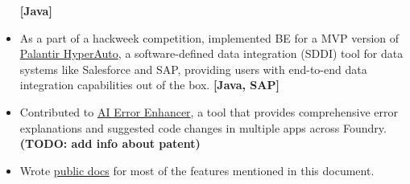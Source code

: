 \begin{itemize}
{    }
    \textbf{[Java]}
    \item {
        As a part of a hackweek competition, implemented BE for a MVP version of
        \href{https://www.palantir.com/docs/foundry/hyperauto/overview/}{Palantir HyperAuto},
        a software-defined data integration (SDDI) tool for data systems like Salesforce and SAP,
        providing users with end-to-end data integration capabilities out of the box.
    }
    \textbf{[Java, SAP]}
    \item {
        Contributed to
        \href{https://www.palantir.com/docs/foundry/code-repositories/aip-features/#ai-error-enhancer}{AI Error Enhancer},
        a tool that provides comprehensive error explanations and suggested code changes in multiple apps across Foundry.
    }
    \textbf{(TODO: add info about patent)}
    \item {
        Wrote
        \href{https://www.palantir.com/docs/foundry/}{public docs}
        for most of the features mentioned in this document.
    }
\end{itemize}

